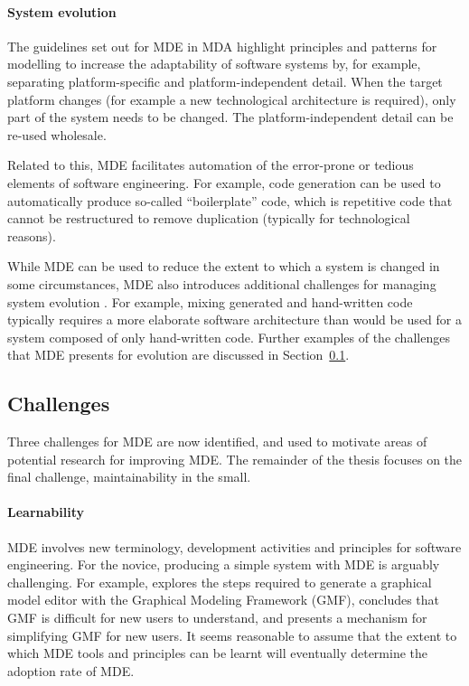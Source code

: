 \paragraph{System evolution} The guidelines set out for MDE in MDA \cite{mda} highlight principles and patterns for modelling to increase the adaptability of software systems by, for example, separating platform-specific and platform-independent detail. When the target platform changes (for example a new technological architecture is required), only part of the system needs to be changed. The platform-independent detail can be re-used wholesale. 

Related to this, MDE facilitates automation of the error-prone or tedious elements of software engineering. For example, code generation can be used to automatically produce so-called ``boilerplate'' code, which is repetitive code that cannot be restructured to remove duplication (typically for technological reasons).

While MDE can be used to reduce the extent to which a system is changed in some circumstances, MDE also introduces additional challenges for managing system evolution \cite{Mens07}. For example, mixing generated and hand-written code typically requires a more elaborate software architecture than would be used for a system composed of only hand-written code. Further examples of the challenges that MDE presents for evolution are discussed in Section~\ref{subsec:mde_challenges}.


\subsection{Challenges}
\label{subsec:mde_challenges}
Three challenges for MDE are now identified, and used to motivate areas of potential research for improving MDE. The remainder of the thesis focuses on the final challenge, maintainability in the small.

\paragraph{Learnability} MDE involves new terminology, development activities and principles for software engineering. For the novice, producing a simple system with MDE is arguably challenging. For example, \cite{kolovos09eugenia} explores the steps required to generate a graphical model editor with the Graphical Modeling Framework (GMF), concludes that GMF is difficult for new users to understand, and presents a mechanism for simplifying GMF for new users. It seems reasonable to assume that the extent to which MDE tools and principles can be learnt will eventually determine the adoption rate of MDE.


